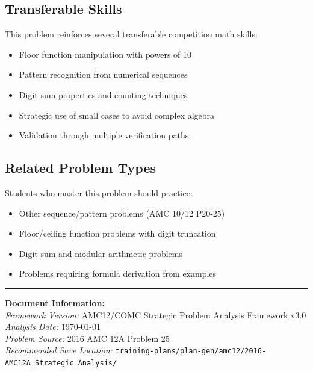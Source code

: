 \documentclass[]{article}
\begin{document}
\subsection*{Transferable Skills}
This problem reinforces several transferable competition math skills:
\begin{itemize}[leftmargin=*]
    \item Floor function manipulation with powers of 10
    \item Pattern recognition from numerical sequences
    \item Digit sum properties and counting techniques
    \item Strategic use of small cases to avoid complex algebra
    \item Validation through multiple verification paths
\end{itemize}

\subsection*{Related Problem Types}
Students who master this problem should practice:
\begin{itemize}[leftmargin=*]
    \item Other sequence/pattern problems (AMC 10/12 P20-25)
    \item Floor/ceiling function problems with digit truncation
    \item Digit sum and modular arithmetic problems
    \item Problems requiring formula derivation from examples
\end{itemize}

\vfill
\hrule
\vspace{0.3cm}
\noindent\textbf{Document Information:}\\
\textit{Framework Version:} AMC12/COMC Strategic Problem Analysis Framework v3.0\\
\textit{Analysis Date:} \today\\
\textit{Problem Source:} 2016 AMC 12A Problem 25\\
\textit{Recommended Save Location:} \texttt{training-plans/plan-gen/amc12/2016-AMC12A\_Strategic\_Analysis/}
\end{document}
